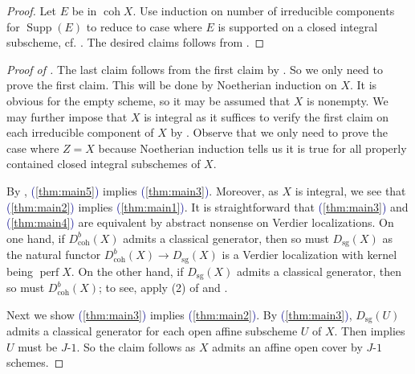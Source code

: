 \documentclass[11pt]{amsart}
\def\eqref#1{\textcolor{darkblue}{(\ref{#1})}}
\theoremstyle{plain}
\theoremstyle{definition}
\numberwithin{equation}{section}
\numberwithin{theorem}{section}
\begin{document}
\begin{proof}
    Let $E$ be in $\operatorname{coh}X$. Use induction on number of irreducible components for $\operatorname{Supp}(E)$ to reduce to case where $E$ is supported on a closed integral subscheme, cf. \cite[\href{https://stacks.math.columbia.edu/tag/01YD}{Tag 01YD}]{StacksProject}. The desired claims follows from .
\end{proof}

\begin{proof}[Proof of ]
    The last claim follows from the first claim by . So we only need to prove the first claim. This will be done by Noetherian induction on $X$. It is obvious for the empty scheme, so it may be assumed that $X$ is nonempty. We may further impose that $X$ is integral as it suffices to verify the first claim on each irreducible component of $X$ by . Observe that we only need to prove the case where $Z=X$ because Noetherian induction tells us it is true for all properly contained closed integral subschemes of $X$.

    By , \eqref{thm:main5} implies \eqref{thm:main3}. Moreover, as $X$ is integral, we see that \eqref{thm:main2} implies \eqref{thm:main1}. It is straightforward that \eqref{thm:main3} and \eqref{thm:main4} are equivalent by abstract nonsense on Verdier localizations. On one hand, if $D^b_{\operatorname{coh}}(X)$ admits a classical generator, then so must $D_{\operatorname{sg}}(X)$ as the natural functor $D^b_{\operatorname{coh}}(X) \to D_{\operatorname{sg}}(X)$ is a Verdier localization with kernel being $\operatorname{perf}X$. On the other hand, if $D_{\operatorname{sg}}(X)$ admits a classical generator, then so must $D^b_{\operatorname{coh}}(X)$; to see, apply (2) of  and \cite[Corollary 3.1.2]{BVdB:2003}.

    Next we show \eqref{thm:main3} implies \eqref{thm:main2}. By \eqref{thm:main3}, $D_{\operatorname{sg}}(U)$ admits a classical generator for each open affine subscheme $U$ of $X$. Then  implies $U$ must be $J\textrm{-}1$. So the claim follows as $X$ admits an affine open cover by $J\textrm{-}1$ schemes.


\end{proof}
\end{document}
